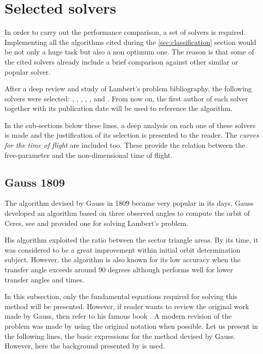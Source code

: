 \section{Selected solvers}

In order to carry out the performance comparison, a set of solvers is required.
Implementing all the algorithms cited during the \ref{sec:classification}
section would be not only a huge task but also a non optimum one. The reason is
that some of the cited solvers already include a brief comparison against other
similar or popular solver.

After a deep review and study of Lambert's problem bibliography, the following
solvers were selected: \cite{gauss1809}, \cite{battin1984}, \cite{gooding1990},
\cite{avanzini2008}, \cite{arora2013}, \cite{vallado2013} and \cite{izzo2015}.
From now on, the first author of each solver together with its publication date
will be used to reference the algorithm.

In the sub-sections below these lines, a deep analysis on each one of these
solvers is made and the justification of its selection is presented to the
reader. The \textit{curves for the time of flight} are included too. These
provide the relation between the free-parameter and the non-dimensional time of
flight.

\subsection{Gauss 1809}

The algorithm devised by Gauss in 1809 became very popular in its days. Gauss
developed an algorithm based on three observed angles to compute the orbit of
Ceres, see \cite{bevdatvs2021} and provided one for solving Lambert's problem.

His algorithm exploited the ratio between the sector triangle areas. By its
time, it was considered to be a great improvement within initial orbit
determination subject. However, the algorithm is also known for its low accuracy
when the transfer angle exceeds around 90 degrees although performs well for
lower transfer angles and times.

In this subsection, only the fundamental equations required for solving this
method will be presented. However, if reader wants to review the original work
made by Gauss, then refer to his famous book . A modern
revision of the problem was made by \cite{teets1999} using the original notation
when possible. Let us present in the following lines, the basic expressions for
the method devised by Gauss. However, here the background presented by
\cite{bate1971} is used.

